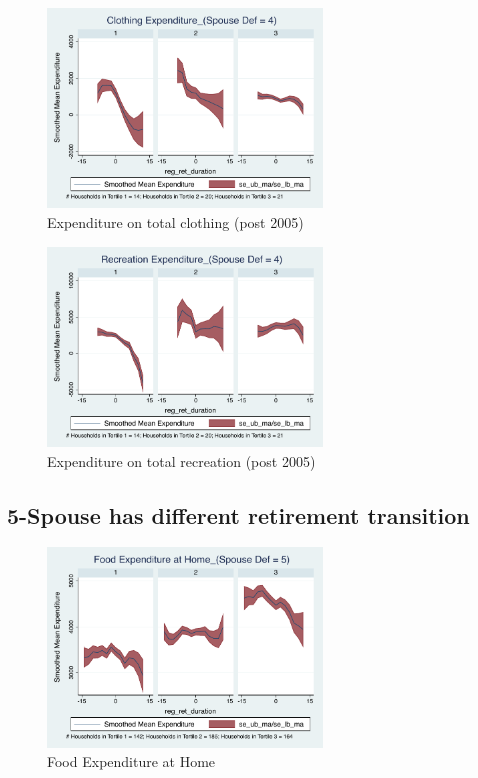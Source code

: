 \documentclass[11pt,onecolumn]{article}
\numberwithin{figure}{section}
\begin{document}
\begin{figure}[h]
	\caption{Expenditure on total clothing (post 2005)}
	\centering
	\includegraphics[width=0.65\textwidth]{../ConsumptionPostRetirement_by_SpouseDef_Cats/Smoothed/4/spouse_def_total_clothing_2005_real.pdf}
\end{figure}

\begin{figure}[h]
	\caption{Expenditure on total recreation (post 2005)}
	\centering
	\includegraphics[width=0.65\textwidth]{../ConsumptionPostRetirement_by_SpouseDef_Cats/Smoothed/4/spouse_def_total_recreation_2005_real.pdf}
\end{figure}

\clearpage

\subsection{5-Spouse has different retirement transition}

\begin{figure}[h]
	\caption{Food Expenditure at Home}
	\centering
	\includegraphics[width=0.65\textwidth]{../ConsumptionPostRetirement_by_SpouseDef_Cats/Smoothed/5/spouse_def_total_foodexp_home_real.pdf}
\end{figure}
\end{document}
